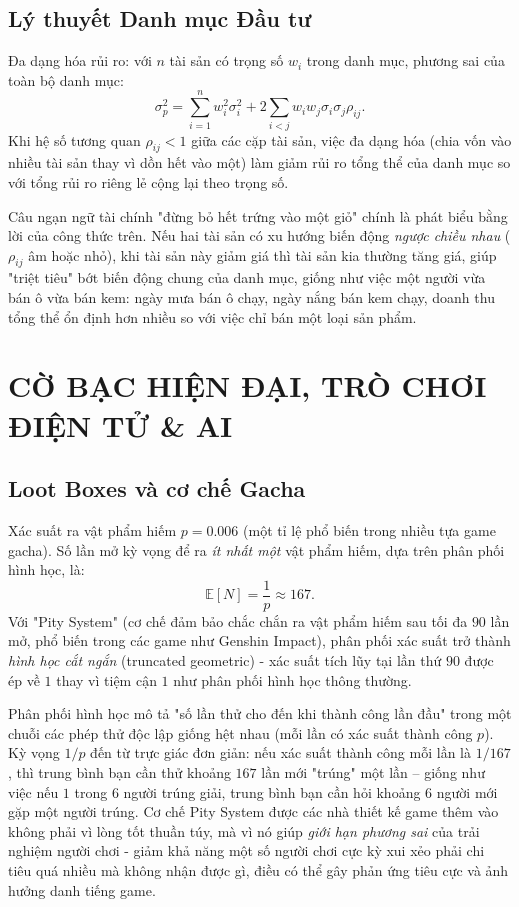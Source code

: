 \documentclass[12pt,a4paper]{article}
\theoremstyle{coloredthm}
\theoremstyle{coloreddef}
\theoremstyle{remark}
\begin{document}
\subsection{Lý thuyết Danh mục Đầu tư}

Đa dạng hóa rủi ro: với $n$ tài sản có trọng số $w_i$ trong danh mục, phương sai của toàn bộ danh mục:
\[
\sigma_p^2 = \sum_{i=1}^n w_i^2 \sigma_i^2 + 2\sum_{i<j} w_i w_j \sigma_i \sigma_j \rho_{ij}.
\]
Khi hệ số tương quan $\rho_{ij} < 1$ giữa các cặp tài sản, việc đa dạng hóa (chia vốn vào nhiều tài sản thay vì dồn hết vào một) làm giảm rủi ro tổng thể của danh mục so với tổng rủi ro riêng lẻ cộng lại theo trọng số.

\begin{giaithich}
Câu ngạn ngữ tài chính "đừng bỏ hết trứng vào một giỏ" chính là phát biểu bằng lời của công thức trên. Nếu hai tài sản có xu hướng biến động \emph{ngược chiều nhau} ($\rho_{ij}$ âm hoặc nhỏ), khi tài sản này giảm giá thì tài sản kia thường tăng giá, giúp "triệt tiêu" bớt biến động chung của danh mục, giống như việc một người vừa bán ô vừa bán kem: ngày mưa bán ô chạy, ngày nắng bán kem chạy, doanh thu tổng thể ổn định hơn nhiều so với việc chỉ bán một loại sản phẩm.
\end{giaithich}

\section{CỜ BẠC HIỆN ĐẠI, TRÒ CHƠI ĐIỆN TỬ \& AI}

\subsection{Loot Boxes và cơ chế Gacha}

Xác suất ra vật phẩm hiếm $p = 0.006$ (một tỉ lệ phổ biến trong nhiều tựa game gacha). Số lần mở kỳ vọng để ra \emph{ít nhất một} vật phẩm hiếm, dựa trên phân phối hình học, là:
\[
\mathbb{E}[N] = \frac{1}{p} \approx 167.
\]
Với "Pity System" (cơ chế đảm bảo chắc chắn ra vật phẩm hiếm sau tối đa $90$ lần mở, phổ biến trong các game như Genshin Impact), phân phối xác suất trở thành \emph{hình học cắt ngắn} (truncated geometric) - xác suất tích lũy tại lần thứ $90$ được ép về $1$ thay vì tiệm cận $1$ như phân phối hình học thông thường.

\begin{giaithich}
Phân phối hình học mô tả "số lần thử cho đến khi thành công lần đầu" trong một chuỗi các phép thử độc lập giống hệt nhau (mỗi lần có xác suất thành công $p$). Kỳ vọng $1/p$ đến từ trực giác đơn giản: nếu xác suất thành công mỗi lần là $1/167$, thì trung bình bạn cần thử khoảng $167$ lần mới "trúng" một lần -- giống như việc nếu $1$ trong $6$ người trúng giải, trung bình bạn cần hỏi khoảng $6$ người mới gặp một người trúng. Cơ chế Pity System được các nhà thiết kế game thêm vào không phải vì lòng tốt thuần túy, mà vì nó giúp \emph{giới hạn phương sai} của trải nghiệm người chơi - giảm khả năng một số người chơi cực kỳ xui xẻo phải chi tiêu quá nhiều mà không nhận được gì, điều có thể gây phản ứng tiêu cực và ảnh hưởng danh tiếng game.
\end{giaithich}
\end{document}
